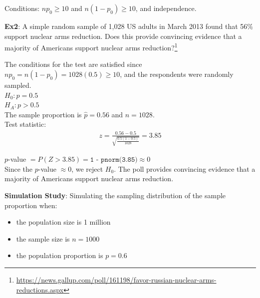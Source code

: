 \documentclass[fleqn, 11pt]{article}\usepackage[]{graphicx}\usepackage[]{color}
\begin{document}
Conditions: $n p_0 \geq 10$ and $n (1-p_0) \geq 10$, and independence.\\
\vspace{11pt}

\textbf{Ex2}: A simple random sample of 1,028 US adults in March 2013 found that 56\% support nuclear arms reduction.  Does this provide convincing evidence that a majority of Americans support nuclear arms reduction?\footnote{\url{https://news.gallup.com/poll/161198/favor-russian-nuclear-arms-reductions.aspx}}\\ 

{\color{blue}The conditions for the test are satisfied since $n p_0 = n (1-p_0) = 1028(0.5) \geq 10$, and the respondents were randomly sampled.\\

$H_0: p = 0.5$\\
$H_A: p > 0.5$\\

The sample proportion is $\hat{p} = 0.56$ and $n=1028$.\\

Test statistic:
\begin{align*}
z = \frac{0.56 - 0.5}{\sqrt{\frac{0.5(1-0.5)}{1028}}} = 3.85
\end{align*}

$p$-value $=P(Z > 3.85) = \texttt{1 - pnorm(3.85)} \approx 0$\\

Since the $p$-value $\approx 0$, we reject $H_0$.  The poll provides convincing evidence that a majority of Americans support nuclear arms reduction.}

\newpage

\textbf{Simulation Study}:  Simulating the sampling distribution of the sample proportion when:
\begin{itemize}
\item the population size is 1 million
\item the sample size is $n=1000$
\item the population proportion is $p=0.6$
\end{itemize}
\end{document}
